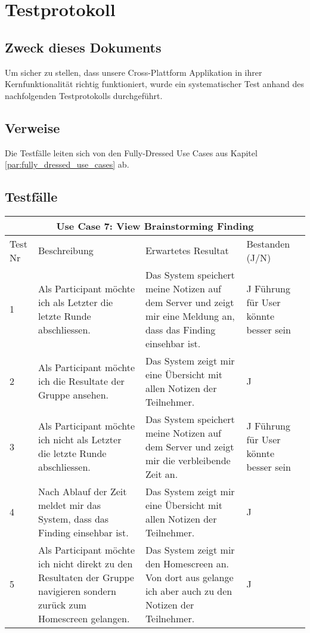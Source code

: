 \section{Testprotokoll}
\subsection{Zweck dieses Dokuments}
Um sicher zu stellen, dass unsere Cross-Plattform Applikation in ihrer Kernfunktionalität richtig funktioniert, wurde ein systematischer Test anhand des nachfolgenden Testprotokolls durchgeführt.

\subsection{Verweise}
Die Testfälle leiten sich von den Fully-Dressed Use Cases aus Kapitel \ref{par:fully_dressed_use_cases} ab.

\subsection{Testfälle}

\renewcommand{\arraystretch}{1.35}
\begin{center}
	\begin{longtable}{| p{1cm} | p{5cm} | p{5cm} | p{2cm} |}
		\hline
		\multicolumn{4}{|c|}{\textbf{Use Case 7: View Brainstorming Finding}}\\
		\hline\hline
		Test Nr & Beschreibung & Erwartetes Resultat & Bestanden (J/N) \\
		\hline
		1 & Als Participant möchte ich als Letzter die letzte Runde abschliessen. & Das System speichert meine Notizen auf dem Server und zeigt mir eine Meldung an, dass das Finding einsehbar ist. & J Führung für User könnte besser sein \\
		\hline
		2 & Als Participant möchte ich die Resultate der Gruppe ansehen. & Das System zeigt mir eine Übersicht mit allen Notizen der Teilnehmer. & J\\
		\hline
		3 & Als Participant möchte ich nicht als Letzter die letzte Runde abschliessen. & Das System speichert meine Notizen auf dem Server und zeigt mir die verbleibende Zeit an. & J Führung für User könnte besser sein\\
		\hline
		4 & Nach Ablauf der Zeit meldet mir das System, dass das Finding einsehbar ist. & Das System zeigt mir eine Übersicht mit allen Notizen der Teilnehmer. & J\\
		\hline
		5 & Als Participant möchte ich nicht direkt zu den Resultaten der Gruppe navigieren sondern zurück zum Homescreen gelangen. & Das System zeigt mir den Homescreen an. Von dort aus gelange ich aber auch zu den Notizen der Teilnehmer. & J  \\
		\hline
	\end{longtable}
\end{center}


